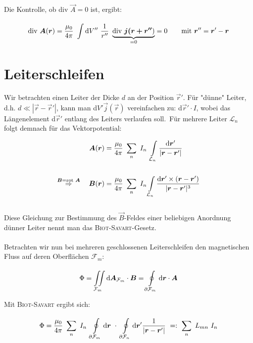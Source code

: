 Die Kontrolle, ob div $\vec{A} =0$ ist, ergibt:

\begin{equation*}
\div\vec{A}(\vec{r}) = \frac{\mu_0}{4\pi} \ \Int{}{}{V''}\ \frac{1}{r''} \ \underbrace{\div\vec{j(\vec{r}+\vec{r}''})}_{=0}=0 \qquad \text{mit } \vec{r}'' = \vec{r}'-\vec{r}
\end{equation*}

\section{Leiterschleifen}

Wir betrachten einen Leiter der Dicke $d$ an der Position $\vec{r}'$. Für "dünne" Leiter, d.h. $d \ll |\vec{r}-\vec{r}'|$, kann man d$V' \vec{j}(\vec{r})$ vereinfachen zu: d$\vec{r}' \cdot I$, wobei das Längenelement d$\vec{r}'$ entlang des Leiters verlaufen soll.\
Für mehrere Leiter $\mathcal{L}_n$ folgt demnach für das Vektorpotential:

\begin{align*}
\vec{A}(\vec{r}) &= \frac{\mu_0}{4\pi}\ \sum_n \ I_n \ \int\limits_{\mathcal{L}_n} \frac{\mathrm{d}\vec{r}'}{|\vec{r}-\vec{r}'|}\\
\ \\
\overset{\vec{B}= \rot\vec{A}}{\Rightarrow} \quad \vec{B}(\vec{r}) &= \frac{\mu_0}{4\pi} \ \sum_n \ I_n \int\limits_{\mathcal{L}_n} \frac{\mathrm{d}\vec{r}' \times (\vec{r}-\vec{r}')}{|\vec{r}-\vec{r}'|^3}
\end{align*}
\ \\
Diese Gleichung zur Bestimmung des $\vec{B}$-Feldes einer beliebigen Anordnung dünner Leiter nennt man das \textsc{Biot-Savart}-Gesetz.\
\\
\ \\
Betrachten wir nun bei mehreren geschlossenen Leiterschleifen den magnetischen Fluss auf deren Oberflächen $\mathcal{F}_m$:

\begin{equation*}
\Phi = \iint\limits_{{\mathcal{F}_m}}^{{}}\mathrm{d}{\bm{A}_{\mathcal{F}_m}}\cdot\bm{B} = \oint\limits_{{\partial\mathcal{F}_m}}^{{}}\mathrm{d}{\bm{r}}\cdot\bm{A}
\end{equation*}

Mit \textsc{Biot-Savart} ergibt sich:

\begin{equation*}
\Phi = \frac{\mu_0}{4\pi}\ \sum_n \ I_n \ \Oint{\partial\mathcal{F}_m}{}{\vec{r}}\ \cdot \ \Oint{\partial\mathcal{F}_n}{}{\vec{r}'}\frac{1}{|\vec{r}-\vec{r}'|} \ =: \ \sum_n \ L_{mn} \ I_n
\end{equation*}

